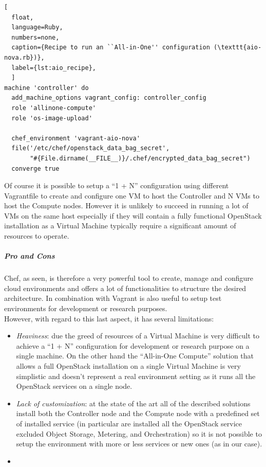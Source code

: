 \begin{lstlisting}[
  float,
  language=Ruby,
  numbers=none,
  caption={Recipe to run an ``All-in-One'' configuration (\texttt{aio-nova.rb})},
  label={lst:aio_recipe},
  ]
machine 'controller' do
  add_machine_options vagrant_config: controller_config
  role 'allinone-compute'
  role 'os-image-upload'

  chef_environment 'vagrant-aio-nova'
  file('/etc/chef/openstack_data_bag_secret',
       "#{File.dirname(__FILE__)}/.chef/encrypted_data_bag_secret")
  converge true
\end{lstlisting}

Of course it is possible to setup a ``1 + N'' configuration using different Vagrantfile to create and configure one VM to host the Controller and N VMs to host the Compute nodes. However it is unlikely to succeed in running a lot of VMs on the same host especially if they will contain a fully functional OpenStack installation as a Virtual Machine typically require a significant amount of resources to operate.


\subparagraph{Pro and Cons}
\label{subp:sota_chef_pro_cons}

Chef, as seen, is therefore a very powerful tool to create, manage and configure cloud environments and offers a lot of functionalities to structure the desired architecture. In combination with Vagrant is also useful to setup test environments for development or research purposes.\\
However, with regard to this last aspect, it has several limitations:
\begin{itemize}
\item \textit{Heaviness}: due the greed of resources of a Virtual Machine is very difficult to achieve a ``1 + N'' configuration for development or research purpose on a single machine. On the other hand the ``All-in-One Compute'' solution that allows a full OpenStack installation on a single Virtual Machine is very simplistic and doesn't represent a real environment setting as it runs all the OpenStack services on a single node.
\item \textit{Lack of customization}: at the state of the art all of the described solutions install both the Controller node and the Compute node with a predefined set of installed service (in particular are installed all the OpenStack service excluded Object Storage, Metering, and Orchestration) so it is not possible to setup the environment with more or less services or new ones (as in our case).
\item {}
\end{itemize}


